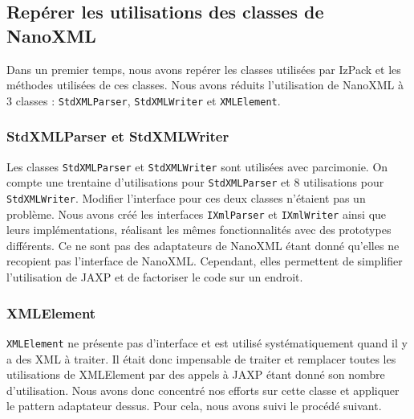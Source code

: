 \subsection{Repérer les utilisations des classes de NanoXML}
Dans un premier temps, nous avons repérer les classes utilisées par IzPack et les méthodes utilisées de ces classes.
Nous avons réduits l'utilisation de NanoXML à 3 classes : \verb|StdXMLParser|, \verb|StdXMLWriter| et \verb|XMLElement|.
\subsubsection{StdXMLParser et StdXMLWriter}
Les classes \verb|StdXMLParser| et \verb|StdXMLWriter| sont utilisées avec parcimonie.
On compte une trentaine d'utilisations pour \verb|StdXMLParser| et 8 utilisations pour \verb|StdXMLWriter|.
Modifier l'interface pour ces deux classes n'étaient pas un problème.
Nous avons créé les interfaces \verb|IXmlParser| et \verb|IXmlWriter| ainsi que leurs implémentations, réalisant les mêmes fonctionnalités avec des prototypes différents.
Ce ne sont pas des adaptateurs de NanoXML étant donné qu'elles ne recopient pas l'interface de NanoXML.
Cependant, elles permettent de simplifier l'utilisation de JAXP et de factoriser le code sur un endroit.
\subsubsection{XMLElement}
\verb|XMLElement| ne présente pas d'interface et est utilisé systématiquement quand il y a des XML à traiter.
Il était donc impensable de traiter et remplacer toutes les utilisations de XMLElement par des appels à JAXP étant donné son nombre d'utilisation.
Nous avons donc concentré nos efforts sur cette classe et appliquer le pattern adaptateur dessus.
Pour cela, nous avons suivi le procédé suivant.

